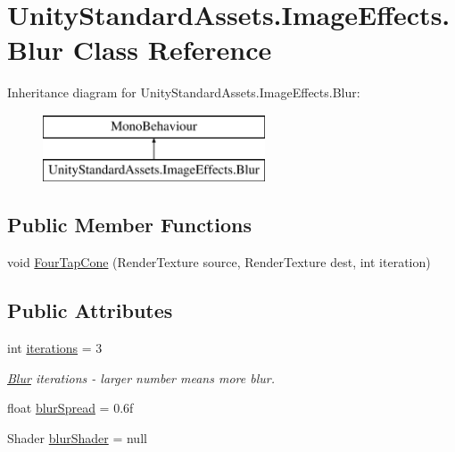 \hypertarget{class_unity_standard_assets_1_1_image_effects_1_1_blur}{}\section{Unity\+Standard\+Assets.\+Image\+Effects.\+Blur Class Reference}
\label{class_unity_standard_assets_1_1_image_effects_1_1_blur}
Inheritance diagram for Unity\+Standard\+Assets.\+Image\+Effects.\+Blur\+:\begin{figure}[H]
\begin{center}
\leavevmode
\includegraphics[height=2.000000cm]{class_unity_standard_assets_1_1_image_effects_1_1_blur}
\end{center}
\end{figure}
\subsection*{Public Member Functions}
\begin{DoxyCompactItemize}
\item 
void \mbox{\hyperlink{class_unity_standard_assets_1_1_image_effects_1_1_blur_a26bb3f789097c645ad578c94c80fbb2b}{Four\+Tap\+Cone}} (Render\+Texture source, Render\+Texture dest, int iteration)
\end{DoxyCompactItemize}
\subsection*{Public Attributes}
\begin{DoxyCompactItemize}
\item 
int \mbox{\hyperlink{class_unity_standard_assets_1_1_image_effects_1_1_blur_ab2609005fc43ef0b62eb286caccccc87}{iterations}} = 3
\begin{DoxyCompactList}\small\item\em \mbox{\hyperlink{class_unity_standard_assets_1_1_image_effects_1_1_blur}{Blur}} iterations -\/ larger number means more blur. \end{DoxyCompactList}\item 
float \mbox{\hyperlink{class_unity_standard_assets_1_1_image_effects_1_1_blur_a6e904a33ffd2d23536a1a118566f8aad}{blur\+Spread}} = 0.\+6f
\item 
Shader \mbox{\hyperlink{class_unity_standard_assets_1_1_image_effects_1_1_blur_a0c784511914827899174cc86ae0b55a7}{blur\+Shader}} = null
\end{DoxyCompactItemize}
